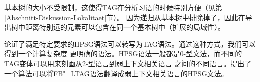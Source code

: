 基本树的大小不受限制，这使得TAG在分析习语的时候特别方便（见第\ref{Abschnitt-Diskussion-Lokalitaet}节）。
因为递归从基本树中排除掉了，因此在导出树中距离特别远的元素可以包含在同一个基本树中（扩展的局域性）。

\citet*{KKNV95a}论证了满足特定要求的HPSG语法可以转写为TAG语法。通过这种方式，我们可以得到一个计算复杂度
更明确的语法。HPSG语法一般都是0-型文法，而不同的TAG变体可以用来刻画从2-型语言到弱上下文相关语言
之间的不同语言\citep{Joshi85a-u}。\citet*{YMTT2001a}提出了一个算法可以将FB"=LTAG语法翻译成弱上下文相关语言的HPSG文法。

\bigskip
{}



